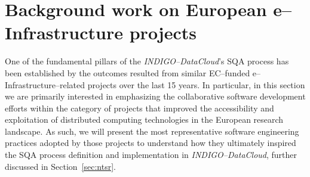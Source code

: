 %
%
%
\section{Background work on European e--Infrastructure projects}
\label{sec:ev}

One of the fundamental pillars of the {\sl INDIGO--DataCloud}'s SQA process has been established
by the outcomes resulted from similar EC--funded e--Infrastructure--related projects over
the last 15 years. In particular, in this section we are primarily interested in emphasizing the 
collaborative
software development efforts within the category of projects that improved the accessibility and
exploitation of distributed computing technologies in the European research landscape. As such, 
we will present the most representative software engineering practices adopted by those projects
to understand how they ultimately inspired the SQA process definition and implementation in 
{\sl INDIGO--DataCloud}, further discussed in Section~\ref{sec:ntsr}. 

